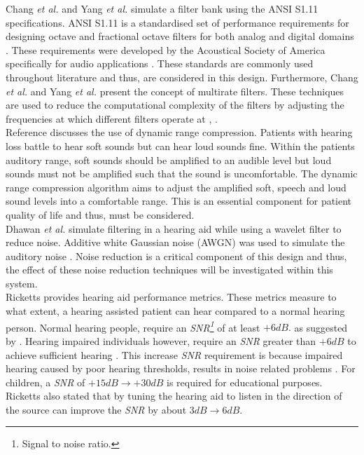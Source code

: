\documentclass[11pt,onecolumn]{witseiepaper}
\begin{document}
\newline
\noindent Chang \textit{et al.} \cite{chang} and Yang \textit{et al.} \cite{ansiAtten} simulate a filter bank using the ANSI S1.11 specifications. ANSI S1.11 is a standardised set of performance requirements for designing octave and fractional octave filters for both analog and digital domains \cite{ansiDoc}. These requirements were developed by the Acoustical Society of America specifically for audio applications \cite{ansiDoc}. These standards are commonly used throughout literature and thus, are considered in this design. Furthermore, Chang \textit{et al.} and Yang \textit{et al.} present the concept of multirate filters. These techniques are used to reduce the computational complexity of the filters by adjusting the frequencies at which different filters operate at \cite{chang}, \cite{ansiAtten}.\\
\newline
\noindent Reference \cite{compressHand} discusses the use of dynamic range compression. Patients with hearing loss battle to hear soft sounds but can hear loud sounds fine. Within the patients auditory range, soft sounds should be amplified to an audible level but loud sounds must not be amplified such that the sound is uncomfortable. The dynamic range compression algorithm aims to adjust the amplified soft, speech and loud sound levels into a comfortable range. This is an essential component for patient quality of life and thus, must be considered.\\
\newline
\noindent Dhawan \textit{et al.} simulate filtering in a hearing aid while using a wavelet filter to reduce noise. Additive white Gaussian noise (AWGN) was used to simulate the auditory noise \cite{dhawan}. Noise reduction is a critical component of this design and thus, the effect of these noise reduction techniques will be investigated within this system. \\
\newline
\noindent Ricketts \cite{ricketts} provides hearing aid performance metrics. These metrics measure to what extent, a hearing assisted patient can hear compared to a normal hearing person. Normal hearing people, require an \textit{SNR\footnote{Signal to noise ratio.}} of at least $+6dB.$ as suggested by \cite{moore}. Hearing impaired individuals however, require an \textit{SNR} greater than $+6dB$ to achieve sufficient hearing \cite{tillman}. This increase \textit{SNR} requirement is because impaired hearing caused by poor hearing thresholds, results in noise related problems \cite{ricketts}. For children, a \textit{SNR} of $+15dB \rightarrow +30dB$ is required for educational purposes. Ricketts also stated that by tuning the hearing aid to listen in the direction of the source can improve the \textit{SNR} by about $3dB \rightarrow 6dB$.\\
\end{document}
